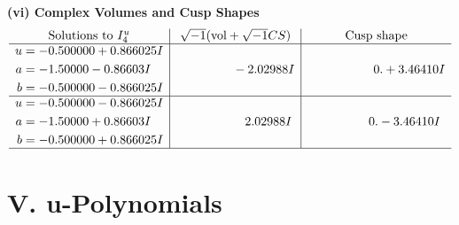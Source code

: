 \documentclass[1p]{elsarticle_modified}
\theoremstyle{definition}
\newcommand{\I}{\sqrt{-1}}
\begin{document}
\newpage\flushleft \textbf{(vi) Complex Volumes and Cusp Shapes}
$$\begin{array}{c|c|c}  
\text{Solutions to }I^u_{4}& \I (\text{vol} + \sqrt{-1}CS) & \text{Cusp shape}\\
 \hline 
\begin{aligned}
u &= -0.500000 + 0.866025 I \\
a &= -1.50000 - 0.86603 I \\
b &= -0.500000 - 0.866025 I\end{aligned}
 & \phantom{-0.000000 } -2.02988 I & \phantom{-0.000000 -}0. + 3.46410 I \\ \hline\begin{aligned}
u &= -0.500000 - 0.866025 I \\
a &= -1.50000 + 0.86603 I \\
b &= -0.500000 + 0.866025 I\end{aligned}
 & \phantom{-0.000000 -}2.02988 I & \phantom{-0.000000 } 0. - 3.46410 I\\
 \hline 
 \end{array}$$\newpage
\newpage\renewcommand{\arraystretch}{1}
\centering \section*{ V. u-Polynomials}
\end{document}
